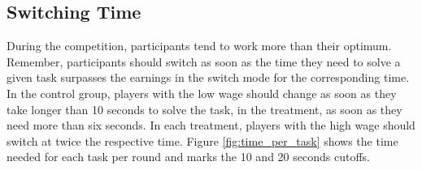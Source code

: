 \begin{table}[!htbp] \centering 
  \caption{Linear Mixed Model - Net Income} 
  \label{table:earnings_lmer}
\end{table} 


\subsection{Switching Time}
During the competition, participants tend to work more than their optimum. Remember, participants should switch as soon as the time they need to solve a given task surpasses the earnings in the switch mode for the corresponding time. In the control group, players with the low wage should change as soon as they take longer than 10 seconds to solve the task, in the treatment, as soon as they need more than six seconds. In each treatment, players with the high wage should switch at twice the respective time. Figure \ref{fig:time_per_task} shows the time needed for each task per round and marks the 10 and 20 seconds cutoffs.\\

